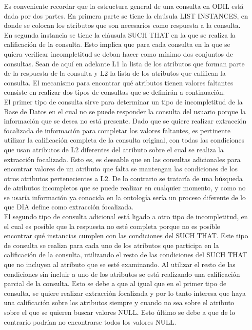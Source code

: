 Es conveniente recordar que la estructura general de una consulta en ODIL está dada por dos partes. En primera parte se tiene la claúsula LIST INSTANCES, en donde se colocan los atributos que son necesarios como respuesta a la consulta. En segunda instancia se tiene la cláusula SUCH THAT en la que se realiza la calificación de la consulta. Esto implica que para cada consulta en la que se quiera verificar incompletitud se deban hacer como mínimo dos conjuntos de consultas. Sean de aquí en adelante L1 la lista de los atributos que forman parte de la respuesta de la consulta y L2 la lista de los atributos que califican la consulta. El mecanismo para encontrar qué atributos tienen valores faltantes consiste en realizar dos tipos de consultas que se definirán a continuación. \\

El primer tipo de consulta sirve para determinar un tipo de incompletitud de la Base de Datos en el cual no se puede responder la consulta del usuario porque la información que se desea no está presente. Dado que se quiere realizar extracción focalizada de información para completar los valores faltantes, es pertinente utilizar la calificación completa de la consulta original, con todas las condiciones que usan atributos de L2 diferentes del atributo sobre el cual se realiza la extracción focalizada. Esto es, es deseable que en las consultas adicionales para encontrar valores de un atributo que falta se mantengan las condiciones de los otros atributos pertenecientes a L2. De lo contrario se trataría de una búsqueda de atributos incompletos que se puede realizar en cualquier momento, y como no se usaría información ya conocida en la ontología sería un proceso diferente de lo que DIA define como extracción focalizada. \\

El segundo tipo de consulta adicional está ligado a otro tipo de incompletitud, en el cual es posible que la respuesta no esté completa porque no es posible encontrar qué instancias cumplen con las condiciones del SUCH THAT. Este tipo de consulta se realiza para cada uno de los atributos que participa en la calificación de la consulta, utilizando el resto de las condiciones del SUCH THAT que no incluyen al atributo que se esté examinando. Al utilizar el resto de las condiciones sin incluir a uno de los atributos se está realizando una calificación parcial de la consulta. Esto se debe a que al igual que en el primer tipo de consulta, se quiere realizar extracción focalizada y por lo tanto interesa que haya una calificación sobre los atributos siempre y cuando no sea sobre el atributo sobre el que se quieren buscar valores NULL. Esto último se debe a que de lo contrario podrían no encontrarse todos los valores NULL. \\

